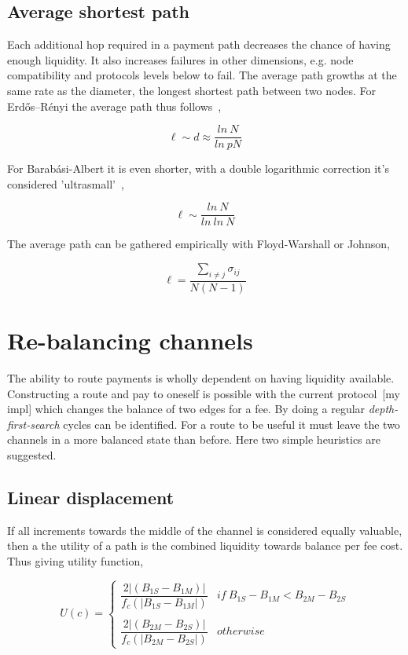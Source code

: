 \subsection{Average shortest path}

Each additional hop required in a payment path decreases the chance of having enough liquidity. It also increases failures in other dimensions, e.g. node compatibility and protocols levels below to fail. The average path growths at the same rate as the diameter, the longest shortest path between two nodes. For Erdős–Rényi the average path thus follows~\cite{watts:stragatz:small:networks},

\[ \ell \sim d \approx \dfrac{ln~N}{ln~pN} \]

For Barabási-Albert it is even shorter, with a double logarithmic correction it's considered 'ultrasmall'~\cite{cohen:havlin:ultrasmall},

\[ \ell \sim \dfrac{ln~N}{ln~ln~N} \]

The average path can be gathered empirically with Floyd-Warshall or Johnson,

\[ \ell = \dfrac{\sum_{i \neq j} \sigma_{ij}}{N(N-1)} \]

\section{Re-balancing channels}

The ability to route payments is wholly dependent on having liquidity available. Constructing a route and pay to oneself is possible with the current protocol~[my impl] which changes the balance of two edges for a fee. By doing a regular \textit{depth-first-search} cycles can be identified. For a route to be useful it must leave the two channels in a more balanced state than before. Here two simple heuristics are suggested. 

\subsection{Linear displacement}
\label{sec:linear:displacement}
If all increments towards the middle of the channel is considered equally valuable, then a the utility of a path is the combined liquidity towards balance per fee cost. Thus giving utility function,

\[ U(c) = \begin{cases} 
\dfrac{2|(B_{1S} - B_{1M})|}{f_c(|B_{1S} - B_{1M}|)}  & if~B_{1S} - B_{1M} < B_{2M} - B_{2S} \\ 
\\
\dfrac{2|(B_{2M} - B_{2S})|}{f_c(|B_{2M} - B_{2S}|)}  & otherwise
\end{cases} \]

